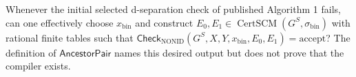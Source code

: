 Whenever the initial selected d-separation check of published Algorithm 1 fails, can one effectively choose \(x_{\mathrm{bin}}\) and construct \(E_0,E_1\in\operatorname{CertSCM}(G^S,\sigma_{\mathrm{bin}})\) with rational finite tables such that \(\mathsf{Check}_{\mathrm{NONID}}(G^S,X,Y,x_{\mathrm{bin}},E_0,E_1)=\mathrm{accept}\)? The definition of \(\mathsf{AncestorPair}\) names this desired output but does not prove that the compiler exists.